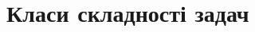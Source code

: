\documentclass[12pt,a4paper]{report}
\begin{document}
\chapter{Класи складності задач}
\end{document}
